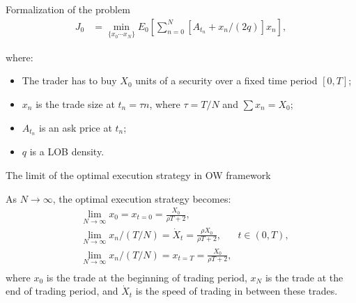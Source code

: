 \documentclass[aspectratio=169]{beamer}
\begin{document}
\begin{frame}{Formalization of the problem}
    \begin{align} \label{optexp}
        J_0 &= \min _{\{x_0 \cdots x_N \}} E_0 \left[ \sum _{n=0}^N [A_{t_n} + x_n /(2q)] x_n\right], 
     \end{align}
     
    where:
    \begin{itemize}
     \item The trader has to buy $X_0$ units of a security over a fixed time period $[0,T]$; 
     \item $x_{n}$ 
     is the trade size at $t_n = \tau n$, where $\tau = T / N$ and $\sum x_n = X_0$;
     \item $A_{t_n}$ is an ask price at $t_n$; 
     \item $q$ is a LOB density. 
    \end{itemize}

\end{frame}


\begin{frame}{The limit of the optimal execution strategy in OW framework}
    
    \begin{theorem}
        As $N \rightarrow \infty$, the optimal execution strategy becomes:
        \begin{align*}
            & \lim _{N \rightarrow \infty} x_0 = x_{t = 0} = \frac{X_0}{\rho T + 2}, \\
            & \lim _{N \rightarrow \infty} x_n / (T/N) = \dot X _t = \frac{\rho X_0}{\rho T + 2}, \;\;\;\;\;\; t \in (0, T), \\
            & \lim _{N \rightarrow \infty} x_n / (T/N) = x_{t=T}=  \frac{X_0}{\rho T + 2},  \\
        \end{align*}
        where $x_0$ is the trade at the beginning of trading period, $x_N$ is the trade at the end of trading
        period, and $\dot X _t$ is the speed of trading in between these trades.
    \end{theorem}

\end{frame}
\end{document}
